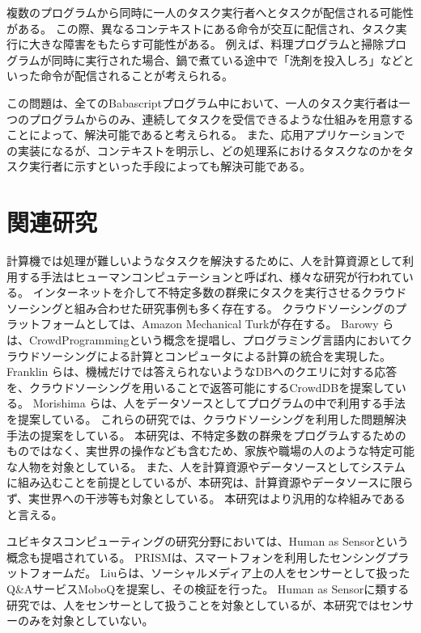 複数のプログラムから同時に一人のタスク実行者へとタスクが配信される可能性がある。
この際、異なるコンテキストにある命令が交互に配信され、タスク実行に大きな障害をもたらす可能性がある。
例えば、料理プログラムと掃除プログラムが同時に実行された場合、鍋で煮ている途中で「洗剤を投入しろ」などといった命令が配信されることが考えられる。

この問題は、全てのBabascriptプログラム中において、一人のタスク実行者は一つのプログラムからのみ、連続してタスクを受信できるような仕組みを用意することによって、解決可能であると考えられる。
また、応用アプリケーションでの実装になるが、コンテキストを明示し、どの処理系におけるタスクなのかをタスク実行者に示すといった手段によっても解決可能である。

\section{関連研究}\label{ux95a2ux9023ux7814ux7a76}

計算機では処理が難しいようなタスクを解決するために、人を計算資源として利用する手法はヒューマンコンピュテーション\cite{HumanComputation}と呼ばれ、様々な研究が行われている。
インターネットを介して不特定多数の群衆にタスクを実行させるクラウドソーシングと組み合わせた研究事例も多く存在する。
クラウドソーシングのプラットフォームとしては、Amazon Mechanical
Turk\cite{mechanicalturk}が存在する。 Barowy
らは、CrowdProgrammingという概念を提唱し、プログラミング言語内においてクラウドソーシングによる計算とコンピュータによる計算の統合を実現した\cite{automan}。
Franklin
らは、機械だけでは答えられないようなDBへのクエリに対する応答を、クラウドソーシングを用いることで返答可能にするCrowdDBを提案している\cite{crowddb}。
Morishima
らは、人をデータソースとしてプログラムの中で利用する手法を提案している\cite{cylog}。
これらの研究では、クラウドソーシングを利用した問題解決手法の提案をしている。
本研究は、不特定多数の群衆をプログラムするためのものではなく、実世界の操作なども含むため、家族や職場の人のような特定可能な人物を対象としている。
また、人を計算資源やデータソースとしてシステムに組み込むことを前提としているが、本研究は、計算資源やデータソースに限らず、実世界への干渉等も対象としている。
本研究はより汎用的な枠組みであると言える。

ユビキタスコンピューティングの研究分野においては、Human as
Sensorという概念も提唱されている。
PRISMは、スマートフォンを利用したセンシングプラットフォームだ\cite{prism}。
Liuらは、ソーシャルメディア上の人をセンサーとして扱ったQ\&AサービスMoboQを提案し、その検証を行った。
Human as
Sensorに類する研究では、人をセンサーとして扱うことを対象としているが、本研究ではセンサーのみを対象としていない。

